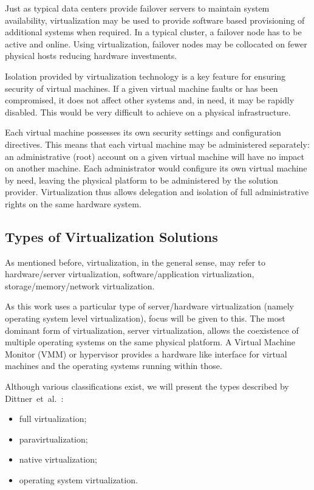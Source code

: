 Just as typical data centers provide failover servers to maintain system
availability, virtualization may be used to provide software based
provisioning of additional systems when required. In a typical cluster, a
failover node has to be active and online. Using virtualization, failover
nodes may be collocated on fewer physical hosts reducing hardware investments.

Isolation provided by virtualization technology is a key feature for ensuring
security of virtual machines. If a given virtual machine faults or has been
compromised, it does not affect other systems and, in need, it may be rapidly
disabled. This would be very difficult to achieve on a physical
infrastructure.

Each virtual machine possesses its own security settings and configuration
directives. This means that each virtual machine may be administered
separately: an administrative (root) account on a given virtual machine will
have no impact on another machine. Each administrator would configure its own
virtual machine by need, leaving the physical platform to be administered by
the solution provider. Virtualization thus allows delegation and isolation of
full administrative rights on the same hardware system.

\subsection{Types of Virtualization Solutions}

As mentioned before, virtualization, in the general sense, may refer to
hardware/server virtualization, software/application virtualization,
storage/memory/network virtualization.

As this work uses a particular type of server/hardware virtualization (namely
operating system level virtualization), focus will be given to this. The most
dominant form of virtualization, server virtualization, allows the coexistence
of multiple operating systems on the same physical platform. A Virtual Machine
Monitor (VMM) or hypervisor provides a hardware like interface for virtual
machines and the operating systems running within those.

Although various classifications exist, we will present the types described by
Dittner~et~al.~\cite{best-damn-virt}:

\begin{itemize}
  \item full virtualization;
  \item paravirtualization;
  \item native virtualization;
  \item operating system virtualization.
\end{itemize}

